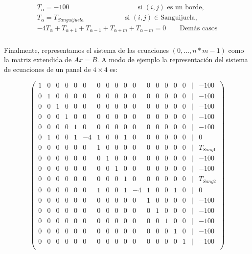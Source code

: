 \documentclass{article}
\begin{document}
\begin{align}\label{A_Label}\\
  \begin{split}
  	T_{\alpha} = -100 \quad \quad \quad \quad \quad \quad \quad \quad \quad \quad  \text{si } (i,j) \text{ es un borde}, \\
  	T_{\alpha} = T_{Sanguijuela} \quad \quad \quad \quad \quad \quad \text{si } (i,j) \in \text{Sanguijuela},\\
	-4T_{\alpha}+T_{\alpha+1}+T_{\alpha-1}+T_{\alpha+m}+T_{\alpha-m} = 0 \quad \quad \text{Demás casos}
  \end{split}
\end{align}\\

Finalmente, representamos el sistema de las ecuaciones $(0,\ldots, n*m-1)$ como la matriz extendida de $Ax=B$.
A modo de ejemplo la representación del sistema de ecuaciones de un panel de $4\times 4$ es:

\setcounter{MaxMatrixCols}{20}


\[ \left( \begin{matrix}
1 & 0 & 0 & 0 & 0 & 0 & 0 & 0 & 0 & 0 & 0 & 0 & 0 & 0 & 0 & 0 & | &-100\\
0 & 1 & 0 & 0 & 0 & 0 & 0 & 0 & 0 & 0 & 0 & 0 & 0 & 0 & 0 & 0 & | &-100\\
0 & 0 & 1 & 0 & 0 & 0 & 0 & 0 & 0 & 0 & 0 & 0 & 0 & 0 & 0 & 0 & | &-100\\
0 & 0 & 0 & 1 & 0 & 0 & 0 & 0 & 0 & 0 & 0 & 0 & 0 & 0 & 0 & 0 & | &-100\\
0 & 0 & 0 & 0 & 1 & 0 & 0 & 0 & 0 & 0 & 0 & 0 & 0 & 0 & 0 & 0 & | &-100\\
0 & 1 & 0 & 0 & 1 & -4 & 1 & 0 & 0 & 1 & 0 & 0 & 0 & 0 & 0 & 0 & | & 0\\
0 & 0 & 0 & 0 & 0 & 0 & 1 & 0 & 0 & 0 & 0 & 0 & 0 & 0 & 0 & 0 & | & T_{Sang1}\\
0 & 0 & 0 & 0 & 0 & 0 & 0 & 1 & 0 & 0 & 0 & 0 & 0 & 0 & 0 & 0 & | &-100\\
0 & 0 & 0 & 0 & 0 & 0 & 0 & 0 & 1 & 0 & 0 & 0 & 0 & 0 & 0 & 0 & | &-100\\
0 & 0 & 0 & 0 & 0 & 0 & 0 & 0 & 0 & 1 & 0 & 0 & 0 & 0 & 0 & 0 & | &T_{Sang2}\\
0 & 0 & 0 & 0 & 0 & 0 & 1 & 0 & 0 & 1 & -4 & 1 & 0 & 0 & 1 & 0 & | &0\\
0 & 0 & 0 & 0 & 0 & 0 & 0 & 0 & 0 & 0 & 0 & 1 & 0 & 0 & 0 & 0 & | &-100\\
0 & 0 & 0 & 0 & 0 & 0 & 0 & 0 & 0 & 0 & 0 & 0 & 1 & 0 & 0 & 0 & | &-100\\
0 & 0 & 0 & 0 & 0 & 0 & 0 & 0 & 0 & 0 & 0 & 0 & 0 & 1 & 0 & 0 & | &-100\\
0 & 0 & 0 & 0 & 0 & 0 & 0 & 0 & 0 & 0 & 0 & 0 & 0 & 0 & 1 & 0 & | &-100\\
0 & 0 & 0 & 0 & 0 & 0 & 0 & 0 & 0 & 0 & 0 & 0 & 0 & 0 & 0 & 1 & | &-100\\


\end{matrix} \right)\] 
\end{document}
